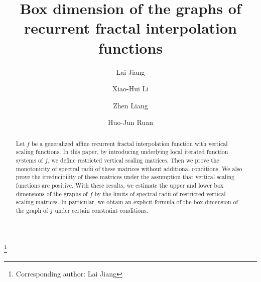 \documentclass[11pt]{amsart}
\theoremstyle{definition}
\theoremstyle{remark}
\numberwithin{equation}{section}
\begin{document}

\title[Box dimension of RFIFs ]{Box dimension of the graphs of \\ recurrent fractal interpolation functions}



\author{Lai Jiang}
\address{School of Fundamental Physics and Mathematical Sciences, Hangzhou Institute for Advanced Study, University of Chinese Academy of Sciences, Hangzhou 310024, China}


\author{Xiao-Hui Li}
\address{School of Mathematics and Information Sciences, Yantai University, Yantai 264000, China}




\author{Zhen Liang}
\address{School of Mathematics, Nanjing Audit University, Nanjing 211815, China}

\author{Huo-Jun Ruan}
\address{School of Mathematical Sciences, Zhejiang University, Hangzhou 310058, China}



\thanks{Corresponding author: Lai Jiang}

\date{}


\begin{abstract}
Let $f$ be a generalized affine recurrent fractal interpolation function with vertical scaling functions. In this paper, by introducing underlying local iterated function systems of $f$, we define restricted vertical scaling matrices. Then we prove the monotonicity of spectral radii of these matrices without additional conditions. We also prove the irreducibility of these matrices under the assumption that vertical scaling functions are positive. With these results, we estimate the upper and lower box dimensions of the graphs of $f$ by the limits of spectral radii of restricted vertical scaling matrices. In particular, we obtain an explicit formula of the box dimension of the graph of $f$ under certain constraint conditions.
\end{abstract}
\end{document}
